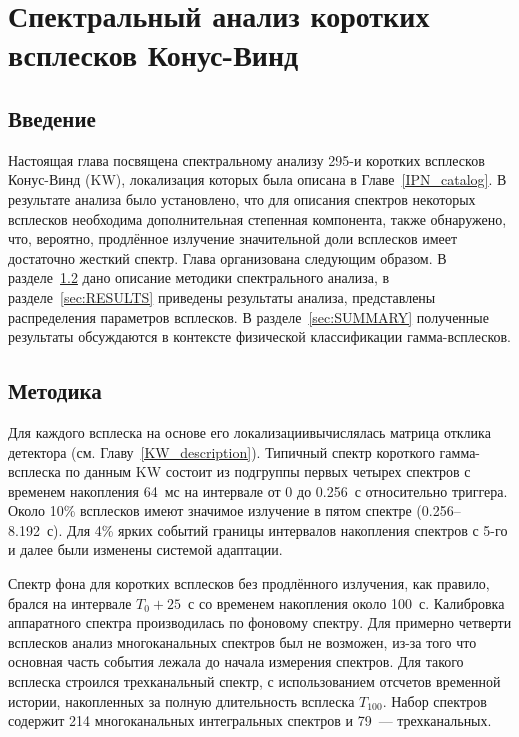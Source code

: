 \chapter{Спектральный анализ коротких всплесков Конус-Винд} \label{sGRB_spectral_catalog}
\section{Введение}
Настоящая глава посвящена спектральному анализу 295-и коротких всплесков Конус-Винд (KW),
локализация которых была описана в Главе~\ref{IPN_catalog}. 
В результате анализа 
было установлено, что для описания спектров некоторых всплесков необходима дополнительная
степенная компонента, также обнаружено, что, вероятно, продлённое излучение значительной доли всплесков
имеет достаточно жесткий спектр.
Глава организована следующим образом.
В разделе~\ref{sec:DATA ANALYSIS} дано описание методики спектрального анализа,
в разделе~\ref{sec:RESULTS} приведены результаты анализа, представлены распределения параметров всплесков.
В разделе~\ref{sec:SUMMARY} полученные результаты обсуждаются в контексте физической 
классификации гамма-всплесков.

\section{Методика}\label{sec:DATA ANALYSIS}
Для каждого всплеска на основе его локализации\footnotemark вычислялась матрица отклика детектора
(см. Главу~\ref{KW_description}).
Типичный спектр короткого гамма-всплеска по данным KW состоит из подгруппы первых 
четырех спектров с временем накопления 64~мс на интервале 
от 0 до 0.256~с относительно триггера. Около 10\% всплесков имеют значимое 
излучение в пятом спектре (0.256--8.192~с). Для 4\% ярких событий
границы интервалов накопления спектров с 5-го и далее были изменены системой адаптации.


Спектр фона для коротких всплесков без продлённого излучения, как правило, 
брался на интервале $T_0+25$~с со временем накопления около 100~с.
Калибровка аппаратного спектра производилась по фоновому спектру.
Для примерно четверти всплесков анализ многоканальных спектров был не возможен, из-за того 
что основная часть события лежала до начала измерения спектров. 
Для такого всплеска строился трехканальный спектр, с использованием отсчетов временной истории, 
накопленных за полную длительность всплеска $T_{100}$.
Набор спектров содержит 214 многоканальных интегральных спектров и 79~--- трехканальных. 

